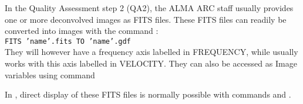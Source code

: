 In the Quality Assessment step 2 (QA2), the ALMA ARC staff usually provides one
or more deconvolved images as FITS files.  These FITS files can readily
be converted into \gildas{} images with the \sic{} command : \\
  \texttt{FITS 'name'.fits TO 'name'.gdf}\\
They will however have a frequency
axis labelled in FREQUENCY, while \gildas{} usually works with this
axis labelled in VELOCITY. 
They can also be accessed as \sic{} Image variables using command

In \imager{}, direct display of these FITS files is normally
possible with commands  and .
